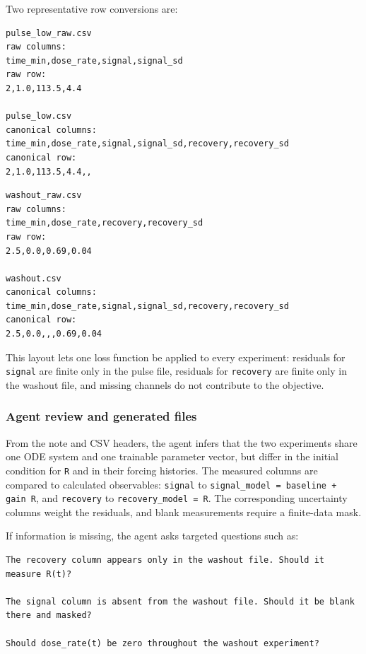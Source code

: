 Two representative row conversions are:

\noindent
\begin{minipage}[t]{0.49\textwidth}
\small
\begin{verbatim}
pulse_low_raw.csv
raw columns:
time_min,dose_rate,signal,signal_sd
raw row:
2,1.0,113.5,4.4

pulse_low.csv
canonical columns:
time_min,dose_rate,signal,signal_sd,recovery,recovery_sd
canonical row:
2,1.0,113.5,4.4,,
\end{verbatim}
\end{minipage}\hfill
\begin{minipage}[t]{0.49\textwidth}
\small
\begin{verbatim}
washout_raw.csv
raw columns:
time_min,dose_rate,recovery,recovery_sd
raw row:
2.5,0.0,0.69,0.04

washout.csv
canonical columns:
time_min,dose_rate,signal,signal_sd,recovery,recovery_sd
canonical row:
2.5,0.0,,,0.69,0.04
\end{verbatim}
\end{minipage}

This layout lets one loss function be applied to every experiment: residuals
for \texttt{signal} are finite only in the pulse file, residuals for
\texttt{recovery} are finite only in the washout file, and missing channels do
not contribute to the objective.

\subsubsection{Agent review and generated files}

From the note and CSV headers, the agent infers that the two experiments share
one ODE system and one trainable parameter vector, but differ in the initial
condition for \texttt{R} and in their forcing histories. The measured columns are compared to calculated observables: \texttt{signal}
to \texttt{signal\_model = baseline + gain R}, and \texttt{recovery} to
\texttt{recovery\_model = R}. The corresponding uncertainty columns weight the
residuals, and blank measurements require a finite-data mask.

If information is missing, the agent asks targeted questions such as:

\begin{verbatim}
The recovery column appears only in the washout file. Should it measure R(t)?

The signal column is absent from the washout file. Should it be blank there and masked?

Should dose_rate(t) be zero throughout the washout experiment?
\end{verbatim}

